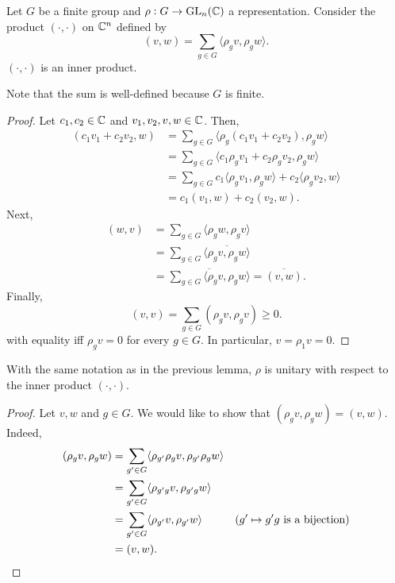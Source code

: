 			\begin{lemma}
				\label{lemma 1.57}
				Let $G$ be a finite group and $\rho : G \to \operatorname{GL}_n(\mathbb{C})$ a representation. Consider the product $(\cdot,\cdot)$ on $\mathbb{C}^n$ defined by
				\[ (v,w) = \sum_{g \in G} \langle \rho_gv, \rho_gw\rangle. \]
				$(\cdot,\cdot)$ is an inner product.
			\end{lemma}
			Note that the sum is well-defined because $G$ is finite.
			\begin{proof}
				Let $c_1,c_2 \in \mathbb{C}$ and $v_1,v_2,v,w \in \mathbb{C}$. Then,
				\begin{align*}
					(c_1v_1 + c_2v_2 , w) &= \sum_{g \in G} \langle \rho_g(c_1v_1+c_2v_2) , \rho_gw \rangle \\
						&= \sum_{g \in G} \langle c_1\rho_g v_1 + c_2 \rho_g v_2 , \rho_g w \rangle \\
						&= \sum_{g \in G} c_1 \langle \rho_g v_1, \rho_g w \rangle + c_2 \langle \rho_g v_2, w \rangle \\
						&= c_1 (v_1,w) + c_2 (v_2,w).
				\end{align*}
				Next,
				\begin{align*}
					(w,v) &= \sum_{g \in G} \langle \rho_g w , \rho_g v \rangle \\
						&= \sum_{g \in G} \overline{\langle \rho_g v , \rho_g w \rangle} \\
						&= \overline{\sum_{g \in G} \langle \rho_g v , \rho_g w \rangle} = \overline{(v,w)}.
				\end{align*}
				Finally,
				\[ (v,v) = \sum_{g \in G} (\rho_g v,\rho_g v) \ge 0. \]
				with equality iff $\rho_g v = 0$ for every $g \in G$. In particular, $v = \rho_1 v = 0$.
			\end{proof}

			\begin{lemma}
				\label{lemma 1.58}
				With the same notation as in the previous lemma, $\rho$ is unitary with respect to the inner product $(\cdot,\cdot)$.
			\end{lemma}
			\begin{proof}
				Let $v,w$ and $g \in G$. We would like to show that $(\rho_g v, \rho_g w) = (v, w)$. Indeed,
				\begin{align*}
					(\rho_g v, \rho_g w) &= \sum_{g' \in G} \langle \rho_{g'}\rho_g v , \rho_{g'}\rho_g w \rangle \\
						&= \sum_{g' \in G} \langle \rho_{g'g} v , \rho_{g'g} w \rangle\\
						&= \sum_{g' \in G} \langle \rho_{g'} v , \rho_{g'} w \rangle & (\text{$g' \mapsto g'g$ is a bijection}) \\
						&= (v,w). \qedhere
				\end{align*}
			\end{proof}

